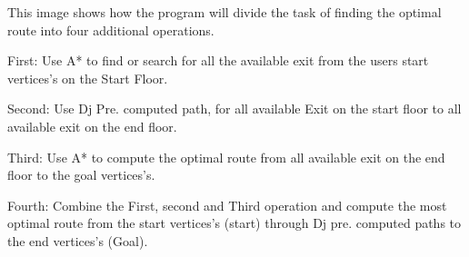 This image shows how the program will divide the task of finding the optimal route into four additional operations. 

  First: Use A* to find or search for all the available exit from the users start vertices's on the Start Floor.

  Second: Use Dj Pre. computed path, for all available Exit on the start floor to all available exit on the end floor.

  Third: Use A* to compute the optimal route from all available exit on the end floor to the goal vertices's. 

  Fourth: Combine the First, second and Third operation and compute the most optimal route from the start vertices's (start) through Dj pre. computed paths to the end vertices's (Goal).